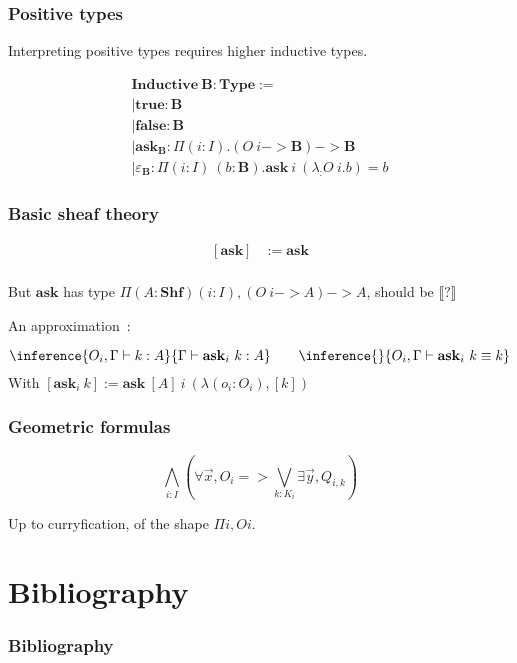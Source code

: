 \documentclass{beamer}
\newcommand{\0}{\boldsymbol{0}}
\newcommand{\1}{\boldsymbol{1}}
\begin{document}
\begin{frame}
    \frametitle{Positive types}
    Interpreting positive types requires higher inductive types.
    
$$
\begin{array}{l}
    \mathbf{Inductive}\ \mathbf{B} : \mathbf{Type} := \\
    \mid \mathbf{true} : \mathbf{B}\\
    \mid \mathbf{false} : \mathbf{B}\\
    \mid \mathbf{ask}_{\mathbf{B}} : \Pi (i:I). (O\ i -> \mathbf{B}) -> \mathbf{B}\\
    \mid \varepsilon_\mathbf{B} : \Pi (i:I)\ (b : \mathbf B). \mathbf{ask}\ i\ (\lambda _ : O\ i. b) = b
\end{array}
$$

\end{frame}

\begin{frame}
    \frametitle{Basic sheaf theory}

    $$\begin{array}{rl}
        [\mathbf{ask}] &:= \mathbf{ask}\\
    \end{array}$$

    But $\mathbf{ask}$ has type  $\Pi (A : \mathbf{Shf}) (i:I), (O\ i -> A ) -> A$, should be $\llbracket ? \rrbracket$
    \vspace{1cm}

    An approximation~:

    $$\inference{O_i,\Gamma\vdash k : A}{\Gamma\vdash \mathbf{ask}_i\ k : A}\qquad \inference{}{O_i,\Gamma\vdash \mathbf{ask}_i\ k \equiv k}$$
    With $[\mathbf{ask}_i\ k] := \mathbf{ask}\ [A]\ i\ (\lambda (o_i: O_i), [k])$
\end{frame}

\begin{frame}
    \frametitle{Geometric formulas}

    $$\bigwedge_{i : I}\left(\forall \overrightarrow{x}, O_i => \bigvee_{k : K_i}\exists \overrightarrow{y}, Q_{i,k}\right)$$
    \vspace{1cm}

    Up to curryfication, of the shape $\Pi i, O i$.
\end{frame}



\section{Bibliography}

\begin{frame}[allowframebreaks]
    \frametitle{Bibliography}

    \printbibliography

\end{frame}
\end{document}

